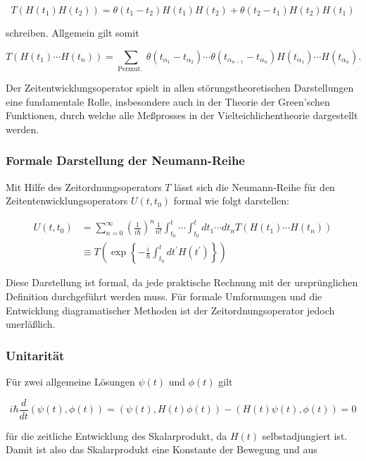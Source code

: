 \documentclass[10pt, letterpaper]{article}
\begin{document}
$$
T\left(H\left(t_{1}\right) H\left(t_{2}\right)\right)=\theta\left(t_{1}-t_{2}\right) H\left(t_{1}\right) H\left(t_{2}\right)+\theta\left(t_{2}-t_{1}\right) H\left(t_{2}\right) H\left(t_{1}\right)
$$

schreiben. Allgemein gilt somit

$$
T\left(H\left(t_{1}\right) \cdots H\left(t_{n}\right)\right)=\sum_{\text {Permut. }} \theta\left(t_{\alpha_{1}}-t_{\alpha_{2}}\right) \cdots \theta\left(t_{\alpha_{n-1}}-t_{\alpha_{n}}\right) H\left(t_{\alpha_{1}}\right) \cdots H\left(t_{\alpha_{n}}\right) .
$$

Der Zeitentwicklungsoperator spielt in allen störungstheoretischen Darstellungen eine fundamentale Rolle, insbesondere auch in der Theorie der Green'schen Funktionen, durch welche alle Meßprosses in der Vielteichlichentheorie dargestellt werden.

\subsubsection*{Formale Darstellung der Neumann-Reihe}
Mit Hilfe des Zeitordnungsoperators $T$ lässt sich die Neumann-Reihe für den Zeitentenwicklungsoperators $U\left(t, t_{0}\right)$ formal wie folgt darstellen:

$$
\begin{aligned}
U\left(t, t_{0}\right) & =\sum_{n=0}^{\infty}\left(\frac{1}{i \hbar}\right)^{n} \frac{1}{n!} \int_{t_{0}}^{t} \cdots \int_{t_{0}}^{t} d t_{1} \cdots d t_{n} T\left(H\left(t_{1}\right) \cdots H\left(t_{n}\right)\right) \\
& \equiv T\left(\exp \left\{-\frac{i}{\hbar} \int_{t_{0}}^{t} d t^{\prime} H\left(t^{\prime}\right)\right\}\right)
\end{aligned}
$$

Diese Darstellung ist formal, da jede praktische Rechnung mit der ursprünglichen Definition durchgeführt werden muss. Für formale Umformungen und die Entwicklung diagramatischer Methoden ist der Zeitordnungsoperator jedoch unerläßlich.

\subsubsection*{Unitarität}
Für zwei allgemeine Lösungen $\psi(t)$ und $\phi(t)$ gilt

$$
i \hbar \frac{d}{d t}(\psi(t), \phi(t))=(\psi(t), H(t) \phi(t))-(H(t) \psi(t), \phi(t))=0
$$

für die zeitliche Entwicklung des Skalarprodukt, da $H(t)$ selbstadjungiert ist. Damit ist also das Skalarprodukt eine Konstante der Bewegung und aus
\end{document}
